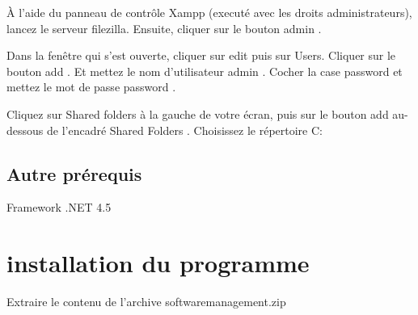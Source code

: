 \documentclass[10pt,a4paper]{report}
\begin{document}
À l'aide du panneau de contrôle Xampp (executé avec les droits administrateurs), lancez le serveur filezilla. Ensuite, cliquer sur le bouton \og admin \fg.

Dans la fenêtre qui s'est ouverte, cliquer sur \og edit \fg{} puis sur Users. Cliquer sur le bouton add . Et mettez le nom d'utilisateur \og admin \fg{} . Cocher la case password et mettez le mot de passe \og password \fg{}.

Cliquez sur \og Shared folders \fg{} à la gauche de votre écran, puis sur le bouton \og add \fg{} au-dessous de l'encadré \og Shared Folders \fg{}. Choisissez le répertoire \og C: \fg{}

\subsection{Autre prérequis}

Framework .NET 4.5 

\section{installation du programme}

Extraire le contenu de l'archive  \og{} software\textunderscore{}management.zip \fg{} 
\end{document}

